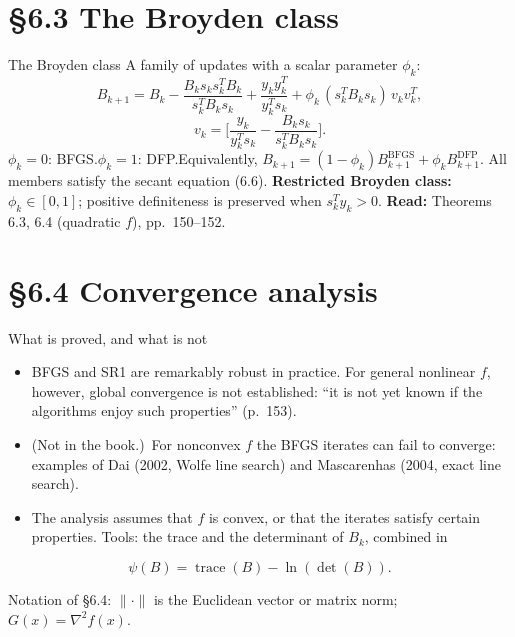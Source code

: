 \documentclass[aspectratio=169,12pt]{beamer}
\newcommand{\hessf}{\nabla^{2} f}
\newcommand{\tr}{\operatorname{trace}}
\newcommand{\readbook}[1]{{\color{red}\textbf{Read:} #1}}
\newcommand{\notinbook}{{\small(Not in the book.)}}
\begin{document}
\section{\S6.3 The Broyden class}

\begin{frame}{The Broyden class}
  A family of updates with a scalar parameter $\phi_{k}$:
  \[
    B_{k+1}=B_{k}-\frac{B_{k}s_{k}s_{k}^{T}B_{k}}{s_{k}^{T}B_{k}s_{k}}+\frac{y_{k}y_{k}^{T}}{y_{k}^{T}s_{k}}
    +\phi_{k}\,(s_{k}^{T}B_{k}s_{k})\,v_{k}v_{k}^{T},
    \tag{6.32}
  \]
  \[
    v_{k}=\Big[\frac{y_{k}}{y_{k}^{T}s_{k}}-\frac{B_{k}s_{k}}{s_{k}^{T}B_{k}s_{k}}\Big] .
    \tag{6.33}
  \]
  $\phi_{k}=0$: BFGS.\quad $\phi_{k}=1$: DFP.\quad Equivalently,
  $B_{k+1}=(1-\phi_{k})B_{k+1}^{\mathrm{BFGS}}+\phi_{k}B_{k+1}^{\mathrm{DFP}}$.
  All members satisfy the secant equation (6.6).
  \textbf{Restricted Broyden class:} $\phi_{k}\in[0,1]$; positive definiteness is preserved when
  $s_{k}^{T}y_{k}>0$. \readbook{Theorems 6.3, 6.4 (quadratic $f$), pp.~150--152.}
\end{frame}

\section{\S6.4 Convergence analysis}

\begin{frame}{What is proved, and what is not}
  \begin{itemize}\setlength\itemsep{0.45em}
    \item BFGS and SR1 are remarkably robust in practice. For general nonlinear $f$,
      however, global convergence is not established: ``it is not yet known if the
      algorithms enjoy such properties'' (p.~153).
    \item \notinbook\ For nonconvex $f$ the BFGS iterates can fail to converge: examples of
      Dai (2002, Wolfe line search) and Mascarenhas (2004, exact line search).
    \item The analysis assumes that $f$ is convex, or that the iterates satisfy certain
      properties. Tools: the trace and the determinant of $B_{k}$, combined in
  \end{itemize}
  \[ \psi(B)=\tr(B)-\ln(\det(B)) . \tag{6.49} \]

  \vspace{0.2em}
  Notation of \S6.4: $\|\cdot\|$ is the Euclidean vector or matrix norm; $G(x)=\hessf(x)$.
\end{frame}
\end{document}
